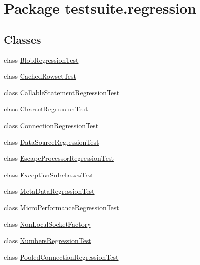 \hypertarget{namespacetestsuite_1_1regression}{}\section{Package testsuite.\+regression}
\label{namespacetestsuite_1_1regression}
\subsection*{Classes}
\begin{DoxyCompactItemize}
\item 
class \mbox{\hyperlink{classtestsuite_1_1regression_1_1_blob_regression_test}{Blob\+Regression\+Test}}
\item 
class \mbox{\hyperlink{classtestsuite_1_1regression_1_1_cached_rowset_test}{Cached\+Rowset\+Test}}
\item 
class \mbox{\hyperlink{classtestsuite_1_1regression_1_1_callable_statement_regression_test}{Callable\+Statement\+Regression\+Test}}
\item 
class \mbox{\hyperlink{classtestsuite_1_1regression_1_1_charset_regression_test}{Charset\+Regression\+Test}}
\item 
class \mbox{\hyperlink{classtestsuite_1_1regression_1_1_connection_regression_test}{Connection\+Regression\+Test}}
\item 
class \mbox{\hyperlink{classtestsuite_1_1regression_1_1_data_source_regression_test}{Data\+Source\+Regression\+Test}}
\item 
class \mbox{\hyperlink{classtestsuite_1_1regression_1_1_escape_processor_regression_test}{Escape\+Processor\+Regression\+Test}}
\item 
class \mbox{\hyperlink{classtestsuite_1_1regression_1_1_exception_subclasses_test}{Exception\+Subclasses\+Test}}
\item 
class \mbox{\hyperlink{classtestsuite_1_1regression_1_1_meta_data_regression_test}{Meta\+Data\+Regression\+Test}}
\item 
class \mbox{\hyperlink{classtestsuite_1_1regression_1_1_micro_performance_regression_test}{Micro\+Performance\+Regression\+Test}}
\item 
class \mbox{\hyperlink{classtestsuite_1_1regression_1_1_non_local_socket_factory}{Non\+Local\+Socket\+Factory}}
\item 
class \mbox{\hyperlink{classtestsuite_1_1regression_1_1_numbers_regression_test}{Numbers\+Regression\+Test}}
\item 
class \mbox{\hyperlink{classtestsuite_1_1regression_1_1_pooled_connection_regression_test}{Pooled\+Connection\+Regression\+Test}}

\end{DoxyCompactItemize}

